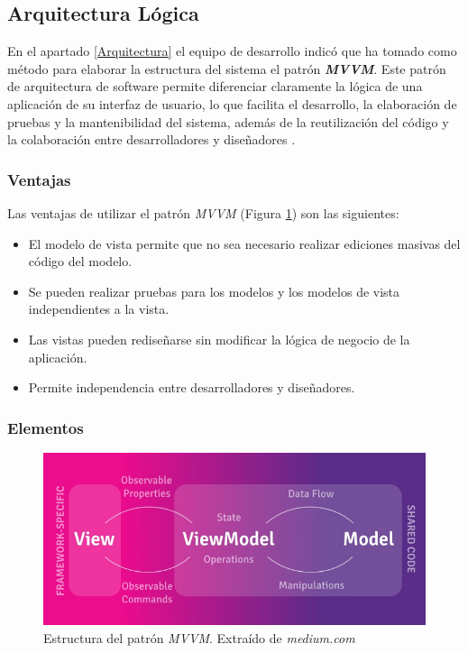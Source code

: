 \subsection{Arquitectura Lógica}
En el apartado \ref{Arquitectura} el equipo de desarrollo indicó que ha tomado como método para elaborar la estructura del 
sistema el patrón \textit{\textbf{MVVM}}. Este patrón de arquitectura de software permite diferenciar claramente 
la lógica de una aplicación de su interfaz de usuario, lo que facilita el desarrollo, la elaboración de pruebas y la 
mantenibilidad del sistema, además de la reutilización del código y la colaboración entre desarrolladores y diseñadores
\autocite{MicrosoftMVVM}. \medskip

\subsubsection{Ventajas}
Las ventajas de utilizar el patrón \textit{MVVM} (Figura \ref*{Estructura_mvvm}) son las siguientes:
\begin{itemize}
    \item El modelo de vista permite que no sea necesario realizar ediciones masivas del código del modelo.
    \item Se pueden realizar pruebas para los modelos y los modelos de vista independientes a la vista.
    \item Las vistas pueden rediseñarse sin modificar la lógica de negocio de la aplicación.
    \item Permite independencia entre desarrolladores y diseñadores.
\end{itemize}

\subsubsection{Elementos}
\begin{figure}[H]
	\centering
	\includegraphics[scale=0.3]{Figures/mvvm_flow.png}
	\caption{Estructura del patrón \textit{MVVM}. Extraído de \textit{medium.com} \autocite*{MvvmFlowDiagram}}
	\label{Estructura_mvvm}
\end{figure}

